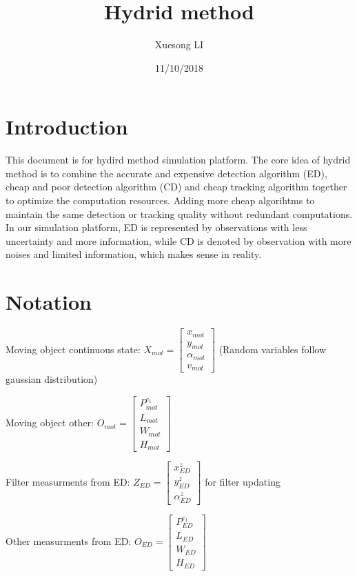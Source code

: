\documentclass[11pt,a4paper]{article}
\begin{document}
\title{Hydrid method}
\author{Xuesong LI}
\date{11/10/2018}
\maketitle

\section{Introduction}
This document is for hydird method simulation platform. The core idea of hydrid method is to combine the accurate and expensive detection algorithm (ED), cheap and poor detection algorithm (CD) and cheap tracking algorithm together to optimize the computation resources. Adding more cheap algorihtms to maintain the same detection or tracking quality without redundant computations. In our simulation platform, ED is represented by observations with less uncertainty and more information, while CD is denoted by observation with more noises and limited information, which makes sense in reality.


\section{Notation}
\noindent Moving object continuous state: $ X_{mot} = \begin{bmatrix} x_{mot} \\ y_{mot} \\ \alpha_{mot} \\ v_{mot} \end{bmatrix}$ (Random variables follow gaussian distribution)

\noindent Moving object other: $ O_{mot} = \begin{bmatrix} P_{mot}^{c_{1}} \\ L_{mot} \\ W_{mot} \\ H_{mot} \end{bmatrix} $

\noindent Filter measurments from ED: $Z_{ED} = \begin{bmatrix} x_{ED}^{z} \\ y_{ED}^{z} \\ \alpha_{ED}^{z} \end{bmatrix}$ for filter updating

\noindent Other measurments from ED: $O_{ED} = \begin{bmatrix} P_{ED}^{c_{1}} \\ L_{ED} \\ W_{ED} \\ H_{ED} \end{bmatrix}$
\end{document}
